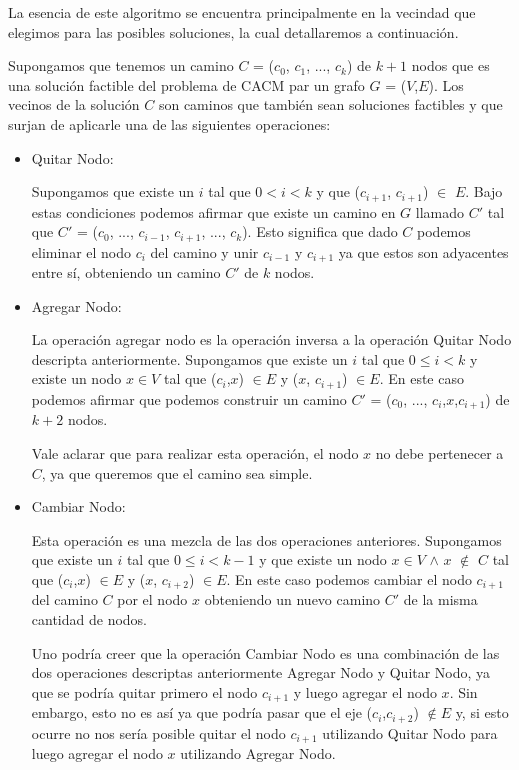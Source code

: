 La esencia de este algoritmo se encuentra principalmente en la vecindad que elegimos para las posibles soluciones, la cual detallaremos a continuación.

Supongamos que tenemos un camino $C$ = ($c_0$, $c_1$, ..., $c_k$) de $k+1$ nodos que es una solución factible del problema de CACM par un grafo $G$ = ($V$,$E$). Los vecinos de la solución $C$ son caminos que también sean soluciones factibles y que surjan de aplicarle una de las siguientes operaciones:

\begin{itemize}
 \item Quitar Nodo:

  Supongamos que existe un $i$ tal que $0 < i < k$ y que ($c_{i+1}$, $c_{i+1}$) $\in$ $E$. Bajo estas condiciones podemos afirmar que existe un camino en $G$ llamado $C'$ tal que $C'$ = ($c_0$, ..., $c_{i-1}$, $c_{i+1}$, ..., $c_k$). Esto significa que dado $C$ podemos eliminar el nodo $c_i$ del camino y unir $c_{i-1}$ y $c_{i+1}$ ya que estos son adyacentes entre sí, obteniendo un camino $C'$ de $k$ nodos.
  \item Agregar Nodo:

  La operación agregar nodo es la operación inversa a la operación Quitar Nodo descripta anteriormente. Supongamos que existe un $i$ tal que $0 \leq i < k$ y existe un nodo $x \in V$ tal que ($c_i$,$x$) $\in E$ y ($x$, $c_{i+1}$) $\in E$. En este caso podemos afirmar que podemos construir un camino $C'$ = ($c_0$, ..., $c_{i}$,$x$,$c_{i+1}$) de $k+2$ nodos.

  Vale aclarar que para realizar esta operación, el nodo $x$ no debe pertenecer a $C$, ya que queremos que el camino sea simple.

  \item Cambiar Nodo:

  Esta operación es una mezcla de las dos operaciones anteriores. Supongamos que existe un $i$ tal que $0 \leq i < k-1$ y que existe un nodo $x \in V$ $\wedge$ $x$ $\notin$ $C$ tal que ($c_i$,$x$) $\in E$ y ($x$, $c_{i+2}$) $\in E$. En este caso podemos cambiar el nodo $c_{i+1}$ del camino $C$ por el nodo $x$ obteniendo un nuevo camino $C'$ de la misma cantidad de nodos.

  Uno podría creer que la operación Cambiar Nodo es una combinación de las dos operaciones descriptas anteriormente Agregar Nodo y Quitar Nodo, ya que se podría quitar primero el nodo $c_{i+1}$ y luego agregar el nodo $x$. Sin embargo, esto no es así ya que podría pasar que el eje ($c_i$,$c_{i+2}$) $\notin E$ y, si esto ocurre no nos sería posible quitar el nodo $c_{i+1}$ utilizando Quitar Nodo para luego agregar el nodo $x$ utilizando Agregar Nodo.

\end{itemize}
 
